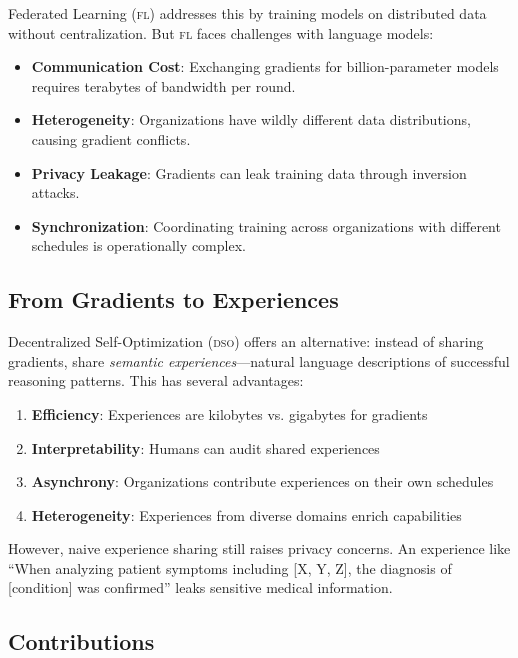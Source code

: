 \documentclass[11pt,letterpaper]{article}
\newcommand{\DSO}{\textsc{dso}}
\newcommand{\FL}{\textsc{fl}}
\begin{document}
Federated Learning (\FL{}) addresses this by training models on distributed data without centralization. But \FL{} faces challenges with language models:

\begin{itemize}
    \item \textbf{Communication Cost}: Exchanging gradients for billion-parameter models requires terabytes of bandwidth per round.

    \item \textbf{Heterogeneity}: Organizations have wildly different data distributions, causing gradient conflicts.

    \item \textbf{Privacy Leakage}: Gradients can leak training data through inversion attacks.

    \item \textbf{Synchronization}: Coordinating training across organizations with different schedules is operationally complex.
\end{itemize}

\subsection{From Gradients to Experiences}

Decentralized Self-Optimization (\DSO{}) offers an alternative: instead of sharing gradients, share \emph{semantic experiences}---natural language descriptions of successful reasoning patterns. This has several advantages:

\begin{enumerate}
    \item \textbf{Efficiency}: Experiences are kilobytes vs. gigabytes for gradients
    \item \textbf{Interpretability}: Humans can audit shared experiences
    \item \textbf{Asynchrony}: Organizations contribute experiences on their own schedules
    \item \textbf{Heterogeneity}: Experiences from diverse domains enrich capabilities
\end{enumerate}

However, naive experience sharing still raises privacy concerns. An experience like ``When analyzing patient symptoms including [X, Y, Z], the diagnosis of [condition] was confirmed'' leaks sensitive medical information.

\subsection{Contributions}
\end{document}

